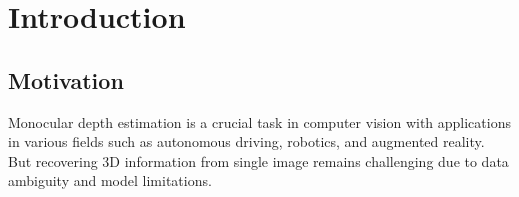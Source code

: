 \documentclass{article}
\begin{document}


\section{Introduction}

\subsection{Motivation}

Monocular depth estimation is a crucial task in computer vision with applications in various fields such as autonomous driving, robotics, and augmented reality. But recovering 3D information from single image remains challenging due to data ambiguity and model limitations.
\end{document}
